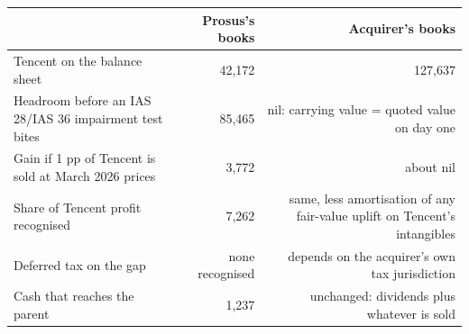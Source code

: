\begin{tabular}{lrr}
\toprule
 & Prosus's books & Acquirer's books \\
\midrule
Tencent on the balance sheet & 42,172 & 127,637 \\
Headroom before an IAS 28/IAS 36 impairment test bites & 85,465 & nil: carrying value = quoted value on day one \\
Gain if 1 pp of Tencent is sold at March 2026 prices & 3,772 & about nil \\
Share of Tencent profit recognised & 7,262 & same, less amortisation of any fair-value uplift on Tencent's intangibles \\
Deferred tax on the gap & none recognised & depends on the acquirer's own tax jurisdiction \\
Cash that reaches the parent & 1,237 & unchanged: dividends plus whatever is sold \\
\bottomrule
\end{tabular}
